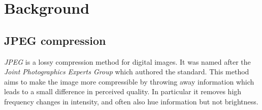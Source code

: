 \chapter{Background}


\section{JPEG compression}


\emph{JPEG} is a lossy compression method for digital images. It was named after the \emph{Joint Photographics Experts Group} which authored the standard. This method aims to make the image more compressible by throwing away information which leads to a small difference in perceived quality. In particular it removes high frequency changes in intensity, and often also hue information but not brightness.

